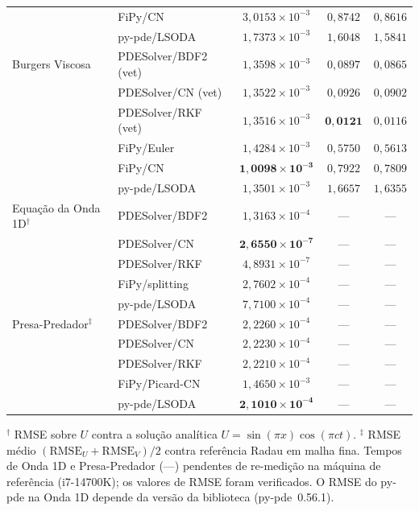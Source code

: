 \documentclass[10pt,brazil,english]{article}
\begin{document}
\begin{table}[!htb]
{\begin{tabular}{llccc}
  & FiPy/CN               & $3{,}0153\times10^{-3}$ & $0{,}8742$ & $0{,}8616$ \\
  & py-pde/LSODA          & $1{,}7373\times10^{-3}$ & $1{,}6048$ & $1{,}5841$ \\
\midrule
Burgers Viscosa
  & PDESolver/BDF2 (vet)  & $1{,}3598\times10^{-3}$ & $0{,}0897$ & $0{,}0865$ \\
  & PDESolver/CN (vet)    & $1{,}3522\times10^{-3}$ & $0{,}0926$ & $0{,}0902$ \\
  & PDESolver/RKF (vet)   & $1{,}3516\times10^{-3}$ & $\mathbf{0{,}0121}$ & $0{,}0116$ \\
  & FiPy/Euler            & $1{,}4284\times10^{-3}$ & $0{,}5750$ & $0{,}5613$ \\
  & FiPy/CN               & $\mathbf{1{,}0098\times10^{-3}}$ & $0{,}7922$ & $0{,}7809$ \\
  & py-pde/LSODA          & $1{,}3501\times10^{-3}$ & $1{,}6657$ & $1{,}6355$ \\
\midrule
Equação da Onda 1D$^{\dagger}$
  & PDESolver/BDF2        & $1{,}3163\times10^{-4}$ & --- & --- \\
  & PDESolver/CN          & $\mathbf{2{,}6550\times10^{-7}}$ & --- & --- \\
  & PDESolver/RKF         & $4{,}8931\times10^{-7}$ & --- & --- \\
  & FiPy/splitting        & $2{,}7602\times10^{-4}$ & --- & --- \\
  & py-pde/LSODA          & $7{,}7100\times10^{-4}$ & --- & --- \\
\midrule
Presa-Predador$^{\ddagger}$
  & PDESolver/BDF2        & $2{,}2260\times10^{-4}$ & --- & --- \\
  & PDESolver/CN          & $2{,}2230\times10^{-4}$ & --- & --- \\
  & PDESolver/RKF         & $2{,}2210\times10^{-4}$ & --- & --- \\
  & FiPy/Picard-CN        & $1{,}4650\times10^{-3}$ & --- & --- \\
  & py-pde/LSODA          & $\mathbf{2{,}1010\times10^{-4}}$ & --- & --- \\
\bottomrule
\end{tabular}}

\vspace{2pt}
{\footnotesize $^{\dagger}$ RMSE sobre $U$ contra a solução analítica $U=\sin(\pi x)\cos(\pi c t)$.
$^{\ddagger}$ RMSE médio $(\mathrm{RMSE}_U+\mathrm{RMSE}_V)/2$ contra referência Radau em malha fina.
Tempos de Onda 1D e Presa-Predador (---) pendentes de re-medição na máquina de referência (i7-14700K); os valores de RMSE foram verificados. O RMSE do py-pde na Onda 1D depende da versão da biblioteca (py-pde~0.56.1).}
\end{table}
\end{document}

